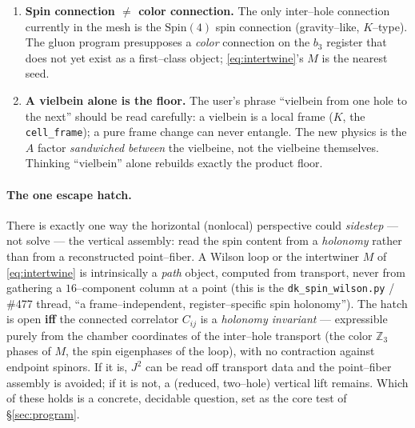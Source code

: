 \documentclass[11pt,oneside]{article}
\newcommand{\Z}{\mathbb{Z}}
\newcommand{\halff}{\tfrac{1}{2}}
\newcommand{\expval}[1]{\langle #1 \rangle}
\newcommand{\code}[1]{\texttt{#1}}
\newcommand{\Spin}{\mathrm{Spin}}
\theoremstyle{plain}
\begin{document}
\begin{enumerate}[leftmargin=2em]
        restricted to a hole) until $\Sigma_a$ is defined on the assembled field,
        so the entangling cross terms sit \emph{downstream} of the lift. In code,
        \code{emergent\_spinor} already performs a degree--$3$--only slice of the
        vertical lift (least--squares the tetrahedral trivector minors into the
        Clifford algebra), which is why $|\expval{\bm S}|=\halff$ per hole is
        robust; the gap is the \emph{all--degree, jointly--across--holes} version.
        Reading two holes independently gives $\rho_i\otimes\rho_j$, so $C_{ij}=0$
        by construction. The pairwise--$C_{ij}$ route therefore \emph{reduces} the
        burden (a two--hole joint lift instead of the full three--hole all--degree
        global lift) but does not remove it --- unless the escape hatch below holds.
  \item \textbf{Spin connection $\ne$ color connection.} The only inter--hole
        connection currently in the mesh is the $\Spin(4)$ spin connection
        (gravity--like, $K$--type). The gluon program presupposes a \emph{color}
        connection on the $b_3$ register that does not yet exist as a first--class
        object; \eqref{eq:intertwine}'s $M$ is the nearest seed.
  \item \textbf{A vielbein alone is the floor.} The user's phrase ``vielbein from
        one hole to the next'' should be read carefully: a vielbein is a local
        frame ($K$, the \code{cell\_frame}); a pure frame change can never
        entangle. The new physics is the $A$ factor \emph{sandwiched between} the
        vielbeine, not the vielbeine themselves. Thinking ``vielbein'' alone
        rebuilds exactly the product floor.
\end{enumerate}

\paragraph{The one escape hatch.}
There is exactly one way the horizontal (nonlocal) perspective could
\emph{sidestep} --- not solve --- the vertical assembly: read the spin content
from a \emph{holonomy} rather than from a reconstructed point--fiber. A Wilson
loop or the intertwiner $M$ of \eqref{eq:intertwine} is intrinsically a
\emph{path} object, computed from transport, never from gathering a $16$--component
column at a point (this is the \code{dk\_spin\_wilson.py} / \#477 thread, ``a
frame--independent, register--specific spin holonomy''). The hatch is open
\textbf{iff} the connected correlator $C_{ij}$ is a \emph{holonomy invariant} ---
expressible purely from the chamber coordinates of the inter--hole transport (the
color $\Z_3$ phases of $M$, the spin eigenphases of the loop), with no contraction
against endpoint spinors. If it is, $J^2$ can be read off transport data and the
point--fiber assembly is avoided; if it is not, a (reduced, two--hole) vertical
lift remains. Which of these holds is a concrete, decidable question, set as the
core test of \S\ref{sec:program}.
\end{document}
